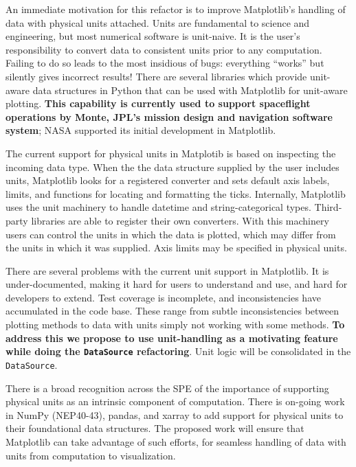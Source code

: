 \documentclass[12pt]{article}
\numberwithin{page}{section}
\begin{document}
An immediate motivation for this refactor is to improve
Matplotlib's handling of data with physical units attached.  Units are
fundamental to science and engineering, but most numerical
software is unit-naive.  It is the user's responsibility to
convert data to consistent units prior to any
computation.  Failing to do so leads to the most insidious of bugs:
everything ``works'' but silently gives incorrect results!  There are
several libraries which provide unit-aware data structures in Python
that can be used with Matplotlib for unit-aware plotting.
\textbf{This capability is currently used to support spaceflight
  operations by Monte, JPL's mission design and navigation software
  system}; NASA supported its initial development in Matplotlib.




The current support for physical units in Matplotib is based on
inspecting the incoming data type.  When the the data structure supplied by
the user includes units, Matplotlib looks for a registered converter and sets
default axis labels, limits, and functions for locating and formatting
the ticks.  Internally, Matplotlib uses the unit machinery to handle
datetime and string-categorical types. Third-party libraries are
able to register their own converters.  With this machinery users can
control the units in which the data is plotted, which may differ from
the units in which it was supplied.  Axis limits may be specified
in physical
units.

There are several problems with the current unit support in
Matplotlib.  It is under-documented, making it hard for users to
understand and use, and hard for developers to extend.  Test
coverage is incomplete, and inconsistencies have accumulated in the
code base.  These range from subtle inconsistencies between plotting
methods to data with units simply not working with some methods.
\textbf{To address this we propose to use unit-handling as a
  motivating feature while doing the \texttt{DataSource} refactoring}.
Unit logic will be consolidated in the \texttt{DataSource}.

There is a broad recognition across the SPE of the importance of
supporting physical units as an intrinsic component of computation.
There is on-going work in NumPy (NEP40-43), pandas, and xarray to add
support for physical units to their foundational data structures.  The
proposed work will ensure that Matplotlib can take advantage
of such efforts, for seamless handling of data with units from computation
to visualization.
\end{document}
